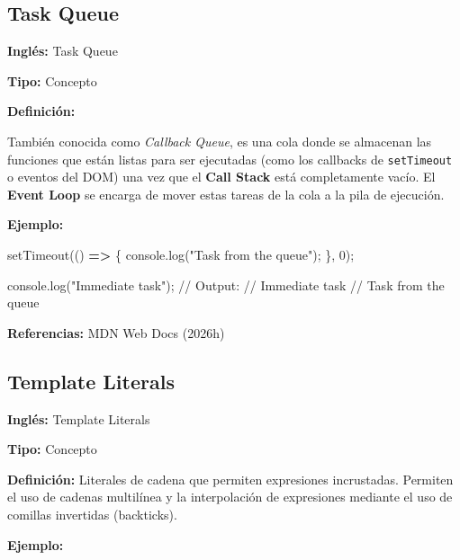 \documentclass[
  letterpaper,
  DIV=11,
  numbers=noendperiod]{scrreprt}
\newenvironment{Shaded}{\begin{snugshade}}{\end{snugshade}}
\newcommand{\BuiltInTok}[1]{\textcolor[rgb]{0.00,0.23,0.31}{#1}}
\newcommand{\CommentTok}[1]{\textcolor[rgb]{0.37,0.37,0.37}{#1}}
\newcommand{\DecValTok}[1]{\textcolor[rgb]{0.68,0.00,0.00}{#1}}
\newcommand{\FunctionTok}[1]{\textcolor[rgb]{0.28,0.35,0.67}{#1}}
\newcommand{\KeywordTok}[1]{\textcolor[rgb]{0.00,0.23,0.31}{\textbf{#1}}}
\newcommand{\NormalTok}[1]{\textcolor[rgb]{0.00,0.23,0.31}{#1}}
\newcommand{\OperatorTok}[1]{\textcolor[rgb]{0.37,0.37,0.37}{#1}}
\newcommand{\PreprocessorTok}[1]{\textcolor[rgb]{0.68,0.00,0.00}{#1}}
\newcommand{\StringTok}[1]{\textcolor[rgb]{0.13,0.47,0.30}{#1}}
\let\oldsubsection\subsection
\renewcommand{\subsection}{\phantomsection\oldsubsection}
\begin{document}

\subsection*{Task Queue}\label{glos-task_queue}

\textbf{Inglés:} Task Queue

\textbf{Tipo:} Concepto

\textbf{Definición:}

También conocida como \emph{Callback Queue}, es una cola donde se
almacenan las funciones que están listas para ser ejecutadas (como los
callbacks de \texttt{setTimeout} o eventos del DOM) una vez que el
\textbf{Call Stack} está completamente vacío. El \textbf{Event Loop} se
encarga de mover estas tareas de la cola a la pila de ejecución.

\textbf{Ejemplo:}

\begin{Shaded}
\begin{Highlighting}[]
\PreprocessorTok{setTimeout}\NormalTok{(() }\KeywordTok{=\textgreater{}}\NormalTok{ \{}
  \BuiltInTok{console}\OperatorTok{.}\FunctionTok{log}\NormalTok{(}\StringTok{"Task from the queue"}\NormalTok{)}\OperatorTok{;}
\NormalTok{\}}\OperatorTok{,} \DecValTok{0}\NormalTok{)}\OperatorTok{;}

\BuiltInTok{console}\OperatorTok{.}\FunctionTok{log}\NormalTok{(}\StringTok{"Immediate task"}\NormalTok{)}\OperatorTok{;}
\CommentTok{// Output:}
\CommentTok{// Immediate task}
\CommentTok{// Task from the queue}
\end{Highlighting}
\end{Shaded}

\textbf{Referencias:} MDN Web Docs (2026h)

\subsection*{Template Literals}\label{glos-template_literals}

\textbf{Inglés:} Template Literals

\textbf{Tipo:} Concepto

\textbf{Definición:} Literales de cadena que permiten expresiones
incrustadas. Permiten el uso de cadenas multilínea y la interpolación de
expresiones mediante el uso de comillas invertidas (backticks).

\textbf{Ejemplo:}
\end{document}
